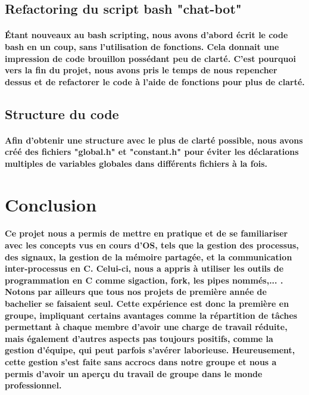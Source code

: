 \documentclass[utf8]{article}
\begin{document}
\subsection{Refactoring du script bash "chat-bot"}
\paragraph{Étant nouveaux au bash scripting, nous avons d'abord écrit le code bash en un coup, sans l'utilisation de fonctions. Cela donnait une impression de
code brouillon possédant peu de clarté. C'est pourquoi vers la fin du projet, nous avons pris le temps de nous repencher dessus et de refactorer le code à l'aide
de fonctions pour plus de clarté.}

\subsection{Structure du code}
\paragraph{Afin d'obtenir une structure avec le plus de clarté possible, nous avons créé des fichiers "global.h" et "constant.h" pour éviter les déclarations
multiples de variables globales dans différents fichiers à la fois.}

\section{Conclusion}
\paragraph{Ce projet nous a permis de mettre en pratique et de se familiariser avec les concepts vus en cours d'OS,
tels que la gestion des processus, des signaux, la gestion de la mémoire partagée, et la communication inter-processus en C.
Celui-ci, nous a appris à utiliser les outils de programmation en C comme sigaction, fork, les pipes nommés,... .
Notons par ailleurs que tous nos projets de première année de bachelier se faisaient seul. Cette expérience est donc
la première en groupe, impliquant certains avantages comme la répartition de tâches permettant à chaque membre d'avoir 
une charge de travail réduite, mais également d'autres aspects pas toujours positifs, comme la gestion d'équipe, qui peut 
parfois s'avérer laborieuse. Heureusement, cette gestion s'est faite sans accrocs dans notre groupe et nous a permis d'avoir
un aperçu du travail de groupe dans le monde professionnel.
}
\end{document}
